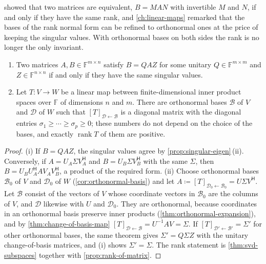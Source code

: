  showed that two matrices are equivalent, $B=MAN$ with invertible $M$ and $N$, if and only if they have the same rank, and \cref{ch:linear-maps} remarked that the bases of the rank normal form can be refined to orthonormal ones at the price of keeping the singular values. With orthonormal bases on both sides the rank is no longer the only invariant.

\begin{theorem}
\label{thm:unitary-equivalence}
\leavevmode
\begin{enumerate}
\item Two matrices $A,B\in\mathbb F^{m\times n}$ satisfy $B=QAZ$ for some unitary $Q\in\mathbb F^{m\times m}$ and $Z\in\mathbb F^{n\times n}$ if and only if they have the same singular values.
\item Let $T\colon V\to W$ be a linear map between finite-dimensional inner product spaces over $\mathbb F$ of dimensions $n$ and $m$. There are orthonormal bases $\mathcal B$ of $V$ and $\mathcal D$ of $W$ such that $[T]_{\mathcal D\leftarrow\mathcal B}$ is a diagonal matrix with the diagonal entries $\sigma_1\ge\cdots\ge\sigma_p\ge0$; these numbers do not depend on the choice of the bases, and exactly $\operatorname{rank}T$ of them are positive.
\end{enumerate}
\end{theorem}

\begin{proof}
(i) If $B=QAZ$, the singular values agree by \cref{prop:singular-eigen}\,(ii). Conversely, if $A=U_A\Sigma V_A^{\mathsf H}$ and $B=U_B\Sigma V_B^{\mathsf H}$ with the same $\Sigma$, then $B=U_BU_A^{\mathsf H}AV_AV_B^{\mathsf H}$, a product of the required form. (ii) Choose orthonormal bases $\mathcal B_0$ of $V$ and $\mathcal D_0$ of $W$ (\cref{cor:orthonormal-basis}) and let $A\coloneqq[T]_{\mathcal D_0\leftarrow\mathcal B_0}=U\Sigma V^{\mathsf H}$. Let $\mathcal B$ consist of the vectors of $V$ whose coordinate vectors in $\mathcal B_0$ are the columns of $V$, and $\mathcal D$ likewise with $U$ and $\mathcal D_0$. They are orthonormal, because coordinates in an orthonormal basis preserve inner products (\cref{thm:orthonormal-expansion}), and by \cref{thm:change-of-basis-map} $[T]_{\mathcal D\leftarrow\mathcal B}=U^{-1}AV=\Sigma$. If $[T]_{\mathcal D'\leftarrow\mathcal B'}=\Sigma'$ for other orthonormal bases, the same theorem gives $\Sigma'=Q\Sigma Z$ with the unitary change-of-basis matrices, and (i) shows $\Sigma'=\Sigma$. The rank statement is \cref{thm:svd-subspaces} together with \cref{prop:rank-of-matrix}.
\end{proof}

